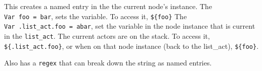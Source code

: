 This creates a named entry in the the current node's instance. The
\texttt{Var\ foo\ =\ bar}, sets the variable. To access it,
\texttt{\$\{foo\}} The \texttt{Var\ .list\_act.foo\ =\ abar}, set the
variable in the node instance that is current in the \texttt{list\_act}.
The current actors are on the stack. To access it,
\texttt{\$\{.list\_act.foo\}}, or when on that node instance (back to
the list\_act), \texttt{\$\{foo\}}.

Also has a \texttt{regex} that can break down the string as named
entries.
